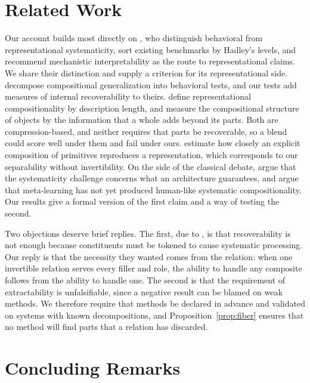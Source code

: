\documentclass{article}
\theoremstyle{definition}
\theoremstyle{plain}
\theoremstyle{remark}
\begin{document}
\section{Related Work}
\label{sec:related}

Our account builds most directly on \citet{vegner2025}, who distinguish
behavioral from representational systematicity, sort existing
benchmarks by Hadley's levels, and recommend mechanistic
interpretability as the route to representational claims. We share
their distinction and supply a criterion for its representational side.
\citet{hupkes2020} decompose compositional generalization into
behavioral tests, and our tests add measures of internal recoverability
to theirs. \citet{elmoznino2024} define representational
compositionality by description length, and \citet{elmoznino2026}
measure the compositional structure of objects by the information that
a whole adds beyond its parts. Both are compression-based, and neither
requires that parts be recoverable, so a blend could score well under
them and fail under ours. \citet{andreas2019} estimate how closely an
explicit composition of primitives reproduces a representation, which
corresponds to our separability without invertibility. On the side of
the classical debate, \citet{goodale2026} argue that the systematicity
challenge concerns what an architecture guarantees, and
\citet{woydt2025} argue that meta-learning has not yet produced
human-like systematic compositionality. Our results give a formal
version of the first claim and a way of testing the second.

Two objections deserve brief replies. The first, due to
\citet{fodor1990}, is that recoverability is not enough because
constituents must be tokened to cause systematic processing. Our reply
is that the necessity they wanted comes from the relation: when one
invertible relation serves every filler and role, the ability to handle
any composite follows from the ability to handle one. The second is
that the requirement of extractability is unfalsifiable, since a
negative result can be blamed on weak methods. We therefore require
that methods be declared in advance and validated on systems with known
decompositions, and Proposition~\ref{prop:fiber} ensures that no method
will find parts that a relation has discarded.

\section{Concluding Remarks}
\label{sec:conclusion}
\end{document}
